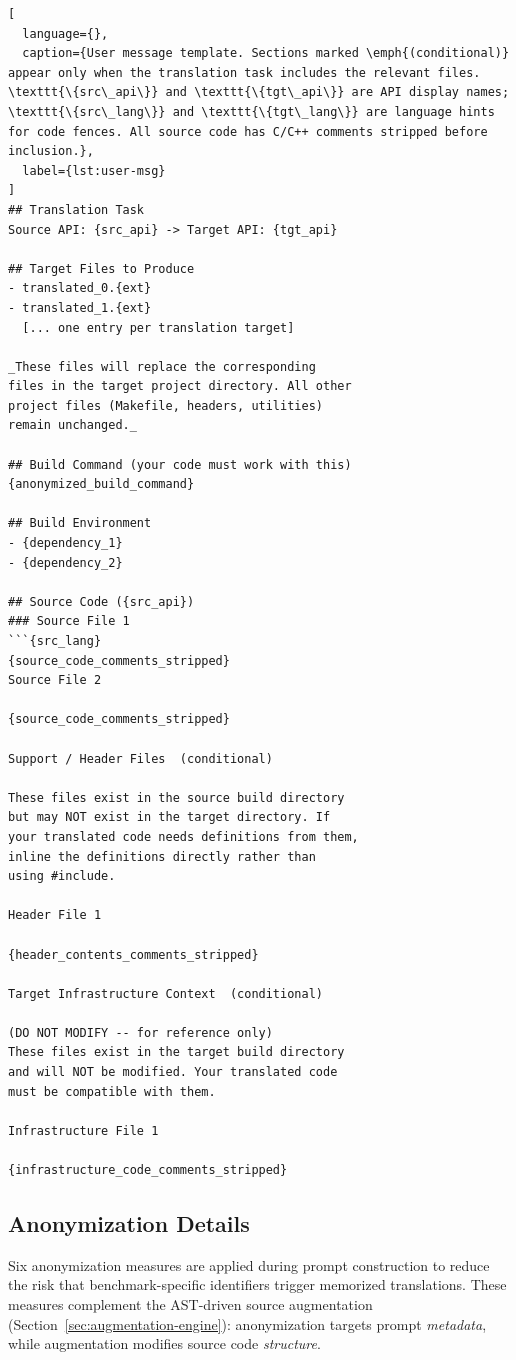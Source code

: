 \begin{lstlisting}[
  language={},
  caption={User message template. Sections marked \emph{(conditional)} appear only when the translation task includes the relevant files. \texttt{\{src\_api\}} and \texttt{\{tgt\_api\}} are API display names; \texttt{\{src\_lang\}} and \texttt{\{tgt\_lang\}} are language hints for code fences. All source code has C/C++ comments stripped before inclusion.},
  label={lst:user-msg}
]
## Translation Task
Source API: {src_api} -> Target API: {tgt_api}

## Target Files to Produce
- translated_0.{ext}
- translated_1.{ext}
  [... one entry per translation target]

_These files will replace the corresponding
files in the target project directory. All other
project files (Makefile, headers, utilities)
remain unchanged._

## Build Command (your code must work with this)
{anonymized_build_command}

## Build Environment
- {dependency_1}
- {dependency_2}

## Source Code ({src_api})
### Source File 1
```{src_lang}
{source_code_comments_stripped}
Source File 2

{source_code_comments_stripped}

Support / Header Files  (conditional)

These files exist in the source build directory
but may NOT exist in the target directory. If
your translated code needs definitions from them,
inline the definitions directly rather than
using #include.

Header File 1

{header_contents_comments_stripped}

Target Infrastructure Context  (conditional)

(DO NOT MODIFY -- for reference only)
These files exist in the target build directory
and will NOT be modified. Your translated code
must be compatible with them.

Infrastructure File 1

{infrastructure_code_comments_stripped}
\end{lstlisting}


\subsection{Anonymization Details}

Six anonymization measures are applied during prompt construction to reduce the risk that benchmark-specific identifiers trigger memorized translations. These measures complement the AST-driven source augmentation (Section~\ref{sec:augmentation-engine}): anonymization targets prompt \emph{metadata}, while augmentation modifies source code \emph{structure}.

